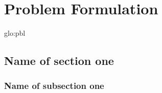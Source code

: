 \chapter{Problem Formulation}

\lipsum[1]

\acrshort{glo:pbl}

\section{Name of section one} \cite{bib:pbl}

\lipsum[2]

\subsection{Name of subsection one}

\lipsum[5]
